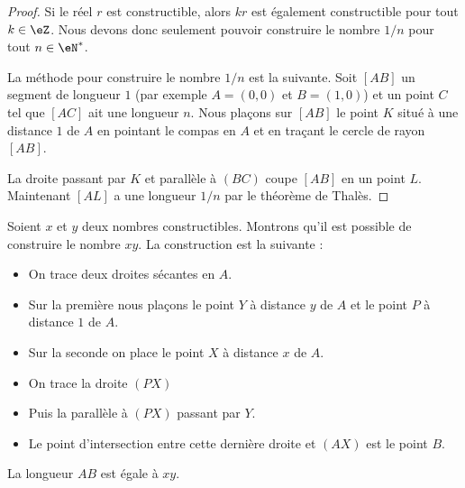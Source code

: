 \begin{proof}
    Si le réel \( r\) est constructible, alors \( kr\) est également constructible pour tout \( k\in \eZ\). Nous devons donc seulement pouvoir construire le nombre \( 1/n\) pour tout \( n\in \eN^*\).

    \begin{center}
   
    \end{center}

    La méthode pour construire le nombre \( 1/n\) est la suivante. Soit \( [AB]\) un segment de longueur \( 1\) (par exemple \( A=(0,0)\) et \( B=(1,0)\)) et un point \( C\) tel que \( [AC]\) ait une longueur \( n\). Nous plaçons sur \( [AB]\) le point \( K\) situé à une distance \( 1\) de \( A\) en pointant le compas en \( A\) et en traçant le cercle de rayon \( [AB]\).

    La droite passant par \( K\) et parallèle à \( (BC)\) coupe \( [AB]\) en un point \( L\). Maintenant \( [AL]\) a une longueur \( 1/n\) par le théorème de Thalès.

\end{proof}

\begin{example}    \label{ExGROooIosiBt}
    Soient \( x\) et \( y\) deux nombres constructibles. Montrons qu'il est possible de construire le nombre \( xy\). La construction est la suivante :

    \begin{center}
   
    \end{center}

    \begin{itemize}
        \item On trace deux droites sécantes en \( A\).
        \item Sur la première nous plaçons le point \( Y\) à distance \( y\) de \( A\) et le point \( P\) à distance \( 1\) de \( A\).
        \item Sur la seconde on place le point \( X\) à distance \( x\) de \( A\).
        \item On trace la droite \( (PX)\)
        \item Puis la parallèle à \( (PX)\) passant par \( Y\).
        \item Le point d'intersection entre cette dernière droite et $(AX)$ est le point \( B\).
    \end{itemize}
    La longueur \( AB\) est égale à \( xy\).
\end{example}

